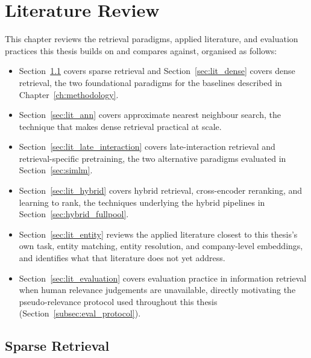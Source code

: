 \documentclass[a4paper,oneside,bibliography=totoc]{scrbook}
\begin{document}
\chapter{Literature Review}
\label{ch:related_literature}

This chapter reviews the retrieval paradigms, applied literature, and evaluation practices this thesis builds on and compares against, organised as follows:
\begin{itemize}
\setlength\itemsep{0pt}
\setlength\parskip{0pt}
\item Section~\ref{sec:lit_sparse_dense} covers sparse retrieval and Section~\ref{sec:lit_dense} covers dense retrieval, the two foundational paradigms for the baselines described in Chapter~\ref{ch:methodology}.
\item Section~\ref{sec:lit_ann} covers approximate nearest neighbour search, the technique that makes dense retrieval practical at scale.
\item Section~\ref{sec:lit_late_interaction} covers late-interaction retrieval and retrieval-specific pretraining, the two alternative paradigms evaluated in Section~\ref{sec:simlm}.
\item Section~\ref{sec:lit_hybrid} covers hybrid retrieval, cross-encoder reranking, and learning to rank, the techniques underlying the hybrid pipelines in Section~\ref{sec:hybrid_fullpool}.
\item Section~\ref{sec:lit_entity} reviews the applied literature closest to this thesis's own task, entity matching, entity resolution, and company-level embeddings, and identifies what that literature does not yet address.
\item Section~\ref{sec:lit_evaluation} covers evaluation practice in information retrieval when human relevance judgements are unavailable, directly motivating the pseudo-relevance protocol used throughout this thesis (Section~\ref{subsec:eval_protocol}).
\end{itemize}

\section{Sparse Retrieval}
\label{sec:lit_sparse_dense}
\end{document}
